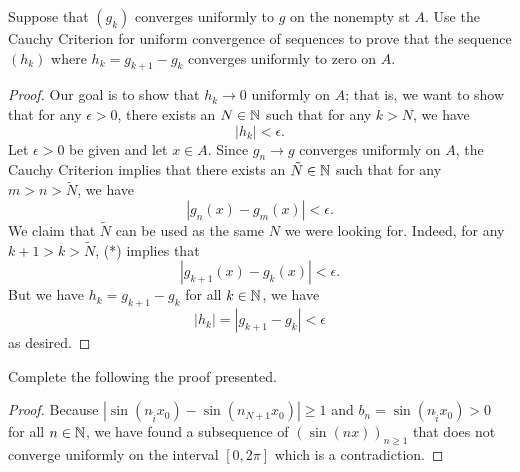 \documentclass[a4paper]{article}
\begin{document}
\begin{problem}
    Suppose that \( ({g}_{k}) \) converges uniformly to \( g  \) on the nonempty st \( A  \). Use the Cauchy Criterion for uniform convergence of sequences to prove that the sequence \( ({h}_{k}) \) where \( {h}_{k} = {g}_{k+1} - {g}_{k} \) converges uniformly to zero on \( A  \). 
\end{problem}
\begin{proof}
Our goal is to show that \( {h}_{k} \to 0  \) uniformly on \( A  \); that is, we want to show that for any \( \epsilon > 0  \), there exists an \( N \in \mathbb{N} \) such that for any \( k > N  \), we have 
\[  | {h}_{k} |  < \epsilon. \]
Let \( \epsilon > 0  \) be given and let \( x \in A  \). Since \( {g}_{n} \to g  \) converges uniformly on \( A  \), the Cauchy Criterion implies that there exists an \( \tilde{N} \in \mathbb{N} \) such that for any \( m > n > \tilde{N} \), we have 
\[  | {g}_{n}(x) - {g}_{m}(x)  | < \epsilon. \tag{*} \]
We claim that \( \tilde{N} \) can be used as the same \( N  \) we were looking for. Indeed, for any \( k + 1 > k > \tilde{N} \), (*) implies that 
\[  | {g}_{k+1}(x) - {g}_{k}(x) |  < \epsilon. \]
But we have \( {h}_{k} = {g}_{k+1} - {g}_{k} \) for all \( k \in \mathbb{N} \), we have 
\[  | {h}_{k} |  = | {g}_{k+1} - {g}_{k}   | < \epsilon  \]
as desired.
\end{proof}

\begin{problem}
    Complete the following the proof presented.
\end{problem}

\begin{proof}
    Because \( | \sin({n}_{\hat{i}} {x}_{0}) - \sin({n}_{N+1} {x}_{0})  | \geq 1  \) and \( {b}_{n} = \sin({n}_{\hat{i}} {x}_{0}) > 0  \) for all \( n \in \mathbb{N} \), we have found a subsequence of \( (\sin(nx))_{n \geq 1} \) that does not converge uniformly on the interval \( [0,2 \pi] \) which is a contradiction.
\end{proof}
\end{document}
